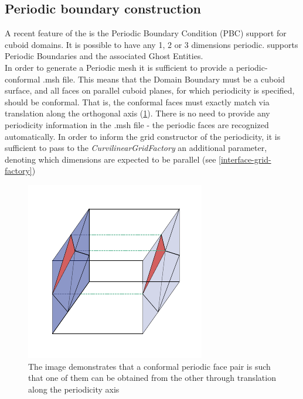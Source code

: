 \subsection{Periodic boundary construction}
\label{impl-grid-constructor-periodic}

A recent feature of the \curvgrid is the Periodic Boundary Condition (PBC) support for cuboid domains. It is possible to have any 1, 2 or 3 dimensions periodic. \curvgrid supports Periodic Boundaries and the associated Ghost Entities. \\

\noindent
In order to generate a Periodic mesh it is sufficient to provide a periodic-conformal .msh file. This means that the Domain Boundary must be a cuboid surface, and all faces on parallel cuboid planes, for which periodicity is specified, should be conformal. That is, the conformal faces must exactly match via translation along the orthogonal axis (\cref{fig:impl:periodicconformal}). There is no need to provide any periodicity information in the .msh file - the periodic faces are recognized automatically. In order to inform the grid constructor of the periodicity, it is sufficient to pass to the \textit{CurvilinearGridFactory} an additional parameter, denoting which dimensions are expected to be parallel (see \cref{interface-grid-factory}) \\

\begin{figure}
    \centering
	\includegraphics[scale=1.5]{images/periodic-conform}
	\captionsetup{width = 0.8\textwidth}
	\caption{The image demonstrates that a conformal periodic face pair is such that one of them can be obtained from the other through translation along the periodicity axis}
	\label{fig:impl:periodicconformal}
\end{figure}


